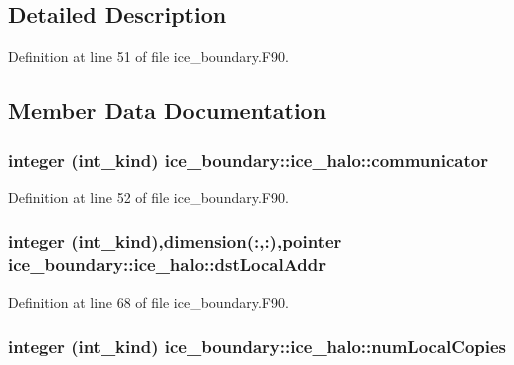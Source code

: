 \subsection{Detailed Description}


Definition at line 51 of file ice\_\-boundary.F90.

\subsection{Member Data Documentation}
\hypertarget{typeice__boundary_1_1ice__halo_a2c3bc7e1a28bb3eda818533eb6bb0ffa}{
\subsubsection[{communicator}]{\setlength{\rightskip}{0pt plus 5cm}integer (int\_\-kind) {\bf ice\_\-boundary::ice\_\-halo::communicator}}}
\label{typeice__boundary_1_1ice__halo_a2c3bc7e1a28bb3eda818533eb6bb0ffa}


Definition at line 52 of file ice\_\-boundary.F90.\hypertarget{typeice__boundary_1_1ice__halo_ae2c9a8697a47b692ca8c945b4dd2d251}{
\subsubsection[{dstLocalAddr}]{\setlength{\rightskip}{0pt plus 5cm}integer (int\_\-kind),dimension(:,:),pointer {\bf ice\_\-boundary::ice\_\-halo::dstLocalAddr}}}
\label{typeice__boundary_1_1ice__halo_ae2c9a8697a47b692ca8c945b4dd2d251}


Definition at line 68 of file ice\_\-boundary.F90.\hypertarget{typeice__boundary_1_1ice__halo_a66c29ae275de42ddc392d9b612db889b}{
\subsubsection[{numLocalCopies}]{\setlength{\rightskip}{0pt plus 5cm}integer (int\_\-kind) {\bf ice\_\-boundary::ice\_\-halo::numLocalCopies}}}
\label{typeice__boundary_1_1ice__halo_a66c29ae275de42ddc392d9b612db889b}


